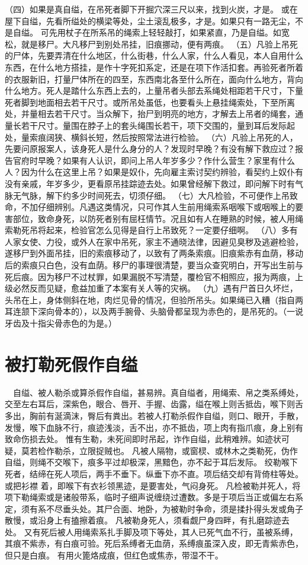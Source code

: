 \documentclass[12pt,UTF8]{ctexbook}
\begin{document}
（四）如果是真自缢，在吊死者脚下开掘穴深三尺以来，找到火炭，才是。
或在屋下自缢，先看所缢处的横梁等处，尘土滚乱极多，才是。如果只有一路无尘，不是自缢。
可先用杖子在所系吊的绳索上轻轻敲打，如果紧直，乃是自缢。如宽松，就是移尸。大凡移尸到别处吊挂，旧痕挪动，便有两痕。
（五）凡验上吊死的尸体，先要弄清在什么地区，什么街巷，什么人家，什么人看见，本人自用什么东西，在什么地方搭挂，是作十字死扣系定，还是在项下作活扣套。再验死者所着的衣服新旧，打量尸体所在的四至，东西南北各至什么所在，面向什么地方，背向什么地方。死人是踏什么东西上去的，上量吊者头部去系绳处相距若干尺寸，下量死者脚到地面相去若干尺寸。或所吊处虽低，也要看头上悬挂绳索处，下至所离处，并量相去若干尺寸。当众解下，抬尸到明亮的地方，才解去上吊者的绳套，通量长若干尺寸。量围在脖子上的套头绳围长若干，项下交围的，量到耳后发际起处，量索痕阔狭、横斜长短，然后按照常法进行检验。
（六）凡验上吊死的人，先要问原报案人，该身死人是什么身分的人？发现时早晚？有没有解下救应过？报告官府时早晚？如果有人认识，即问上吊人年岁多少？作什么营生？家里有什么人？因为什么在这里上吊？如果是奴仆，先向雇主索讨契约辨验，看契约上奴仆有没有亲戚，年岁多少，更看原吊挂踪迹去处。如果曾经解下救过，即问解下时有气脉无气脉，解下约多少时间死去，切须仔细。
（七）大凡检验，不可便作上吊致命，不加仔细辨别。凡遇这类情况，只可作其人生前用绳索系咽喉下或咽喉上的要害部位，致命身死，以防死者别有屈枉情节。况且如有人在睡熟的时候，被人用绳索勒死吊将起来，检验官怎么见得是自行上吊致死？一定要仔细啊。
（八）多有人家女使、力役，或外人在家中吊死，家主不通晓法律，因避见臭秽及逃避检验，遂移尸到外面吊挂，旧的索痕移动了，以致有了两条索痕。旧痕紫赤有血荫，移动后的索痕只白色，没有血荫。移尸的事理很清楚，要当众查究明白，开写出生前与死后痕。因为移尸不过杖罪，如果漏脱不写清楚，覆检官不相照应，报为两痕，上级必然反而见疑，愈益加重了本案有关人等的灾祸。
（九）遇有尸首日久坏烂，头吊在上，身体侧斜在地，肉烂见骨的情况，但验所吊头。如果绳已入糟（指自两耳连颔下深向骨本的），以及两手腕骨、头脑骨都呈现为赤色的，是吊死的。（一说牙齿及十指尖骨赤色的为是。）


\chapter{被打勒死假作自缢}

　自缢、被人勒杀或算杀假作自缢，甚易辨。真自缢者，用绳索、帛之类系缚处，交至左右耳后，深紫色，眼合、唇开、手握、齿露，缢在喉上则舌抵齿，喉下则舌多出，胸前有涎滴沫，臀后有粪出。若被人打勒杀假作自缢，则口、眼开，手散，发慢，喉下血脉不行，痕迹浅淡，舌不出，亦不抵齿，项上肉有指爪痕，身上别有致命伤损去处。
惟有生勒，未死间即时吊起，诈作自缢，此稍难辨。如迹状可疑，莫若检作勒杀，立限捉贼也。
凡被人隔物，或窗棂、或林木之类勒死，伪作自缢，则绳不交喉下，痕多平过却极深，黑黯色，亦不起于耳后发际。
绞勒喉下死者，结缔在死人项后，两手不垂下。纵垂下亦不直。项后结交却有背倚柱等处。或把衫襟 着，即喉下有衣衫领黑迹，是要害处，气闷身死。
凡检被勒并死人，将项下勒绳索或是诸般带系，临时子细声说缠绕过遭数。多是于项后当正或偏左右系定，须有系不尽垂头处。其尸合面、地卧，为被勒时争命，须是揉扑得头发或角子散慢，或沿身上有搕擦着痕。
凡被勒身死人，须看觑尸身四畔，有扎磨踪迹去处。
又有死后被人用绳索系扎手脚及项下等处，其人已死气血不行，虽被系缚，其痕不紫赤，有白痕可验。死后系缚者无血荫，系缚痕虽深入皮，即无青紫赤色，但只是白痕。
有用火篦烙成痕，但红色或焦赤，带湿不干。
\end{document}
